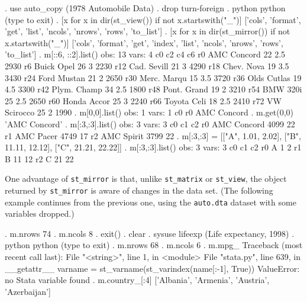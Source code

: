 \documentclass{article}
\begin{document}
\begin{stlog}
{\smallskip}
. use auto_copy
(1978 Automobile Data)
{\smallskip}
. drop turn-foreign
{\smallskip}
. python
 python (type {} to exit) 
{\bftt{>>>}}. [x for x in dir(st_view()) if not x.startswith("_")]
['cols', 'format', 'get', 'list', 'ncols', 'nrows', 'rows', 'to_list']
{\smallskip}
{\bftt{>>>}}. [x for x in dir(st_mirror()) if not x.startswith("_")]
['cols', 'format', 'get', 'index', 'list', 'ncols', 'nrows', 'rows', 'to_list']
{\smallskip}
{\bftt{>>>}}. m[::6, ::2].list()
{\smallskip}
  obs: 13
 vars:  4
{\smallskip}
             c0        c2        c4        c6
 r0 AMC Concord        22       2.5      2930
 r6  Buick Opel        26         3      2230
r12 Cad. Sevill        21         3      4290
r18  Chev. Nova        19       3.5      3430
r24 Ford Mustan        21         2      2650
r30 Merc. Marqu        15       3.5      3720
r36 Olds Cutlas        19       4.5      3300
r42 Plym. Champ        34       2.5      1800
r48 Pont. Grand        19         2      3210
r54    BMW 320i        25       2.5      2650
r60 Honda Accor        25         3      2240
r66 Toyota Celi        18       2.5      2410
r72 VW Scirocco        25         2      1990
{\smallskip}
{\bftt{>>>}}. m[0,0].list()
{\smallskip}
  obs: 1
 vars: 1
{\smallskip}
            c0
r0 AMC Concord
{\smallskip}
{\bftt{>>>}}. m.get(0,0)
'AMC Concord'
{\smallskip}
{\bftt{>>>}}. m[:3,:3].list()
{\smallskip}
  obs: 3
 vars: 3
{\smallskip}
            c0        c1        c2
r0 AMC Concord      4099        22
r1   AMC Pacer      4749        17
r2  AMC Spirit      3799        22
{\smallskip}
{\bftt{>>>}}. m[:3,:3] = [["A", 1.01, 2.02], ["B", 11.11, 12.12], ["C", 21.21, 22.22]]
{\smallskip}
{\bftt{>>>}}. m[:3,:3].list()
{\smallskip}
  obs: 3
 vars: 3
{\smallskip}
            c0        c1        c2
r0           A         1         2
r1           B        11        12
r2           C        21        22
\end{stlog}

\medskip

One advantage of \lstinline{st_mirror} is that, unlike \lstinline{st_matrix} or \lstinline{st_view}, the object returned by \lstinline{st_mirror} is aware of changes in the data set. (The following example continues from the previous one, using the \lstinline{auto.dta} dataset with some variables dropped.)

\begin{stlog}
{\bftt{>>>}}. m.nrows
74
{\smallskip}
{\bftt{>>>}}. m.ncols
8
{\smallskip}
{\bftt{>>>}}. exit()
{\smallskip}
. clear
{\smallskip}
. sysuse lifeexp
(Life expectancy, 1998)
{\smallskip}
. python
 python (type {} to exit) 
{\bftt{>>>}}. m.nrows
68
{\smallskip}
{\bftt{>>>}}. m.ncols
6
{\smallskip}
{\bftt{>>>}}. m.mpg_
{\color{red}Traceback (most recent call last):
  File "<string>", line 1, in <module>
  File "stata.py", line 639, in __getattr__
    varname = st_varname(st_varindex(name[:-1], True))
ValueError: no Stata variable found}
{\smallskip}
{\bftt{>>>}}. m.country_[:4]
['Albania', 'Armenia', 'Austria', 'Azerbaijan']
\end{stlog}
\end{document}
